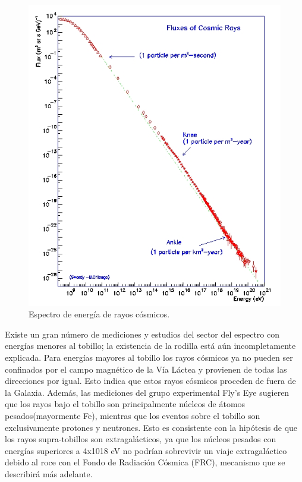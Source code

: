 \begin{figure}[H]
  \centering
    \includegraphics[scale=0.60]{Capitulo1/figs/esp.jpg}      %
  \caption{Espectro de energía de rayos cósmicos.}            %
  \label{espectro}                            %
\end{figure}

Existe un gran número de mediciones y estudios del sector del
espectro con energías menores al tobillo; la existencia de la rodilla
está aún incompletamente explicada. Para energías mayores al tobillo
los rayos cósmicos ya no pueden ser confinados por el campo
magnético de la Vía Láctea y provienen de todas las direcciones por
igual. Esto indica que estos rayos cósmicos proceden de fuera de la
Galaxia. Además, las mediciones del grupo experimental Fly's Eye
sugieren que los rayos bajo el tobillo son principalmente núcleos de
átomos pesados(mayormente Fe), mientras que los eventos sobre el
tobillo son exclusivamente protones y neutrones. Esto es consistente
con la hipótesis de que los rayos supra-tobillos son extragalácticos, ya
que los núcleos pesados con energías superiores a 4x1018 eV no
podrían sobrevivir un viaje extragaláctico debido al roce con el Fondo
de Radiación Cósmica (FRC), mecanismo que se describirá más
adelante.




